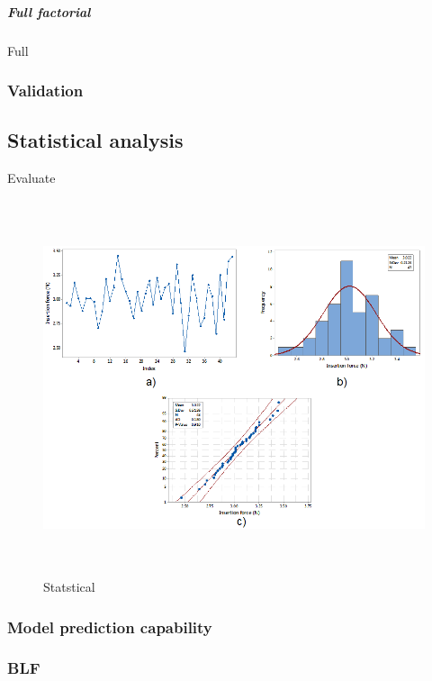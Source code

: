  
\subparagraph*{Full factorial}
Full

 
 \subsubsection{Validation}
 \subsection{Statistical analysis}
Evaluate
\begin{figure}[h!]	
	\centering
\includegraphics[height=11cm]{img/spc.PNG}
   \caption{Statstical}
 \label{fgr:PFS}
 \end{figure}
 
\subsubsection{Model prediction capability}

\subsubsection{BLF}
